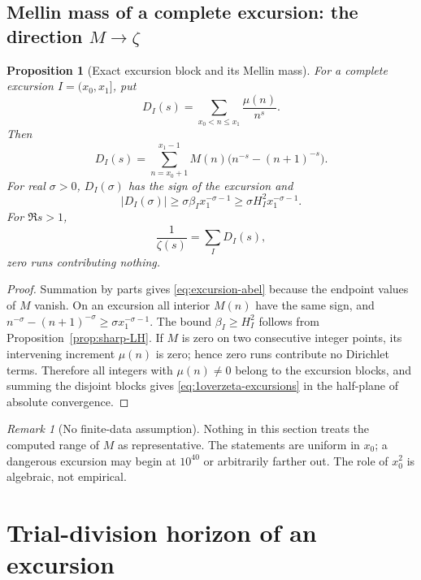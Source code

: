 \documentclass[11pt]{amsart}
\numberwithin{equation}{section}
\theoremstyle{plain}
\newtheorem{proposition}[theorem]{Proposition}
\theoremstyle{definition}
\theoremstyle{remark}
\newtheorem{remark}[theorem]{Remark}
\begin{document}
\subsection{Mellin mass of a complete excursion: the direction $M\to\zeta$}

\begin{proposition}[Exact excursion block and its Mellin mass]
\label{prop:excursion-mellin}
For a complete excursion $I=(x_0,x_1]$, put
\[
D_I(s)=\sum_{x_0<n\le x_1}\frac{\mu(n)}{n^s}.
\]
Then
\begin{equation}
\label{eq:excursion-abel}
D_I(s)=\sum_{n=x_0+1}^{x_1-1}M(n)
\bigl(n^{-s}-(n+1)^{-s}\bigr).
\end{equation}
For real $\sigma>0$, $D_I(\sigma)$ has the sign of the excursion and
\begin{equation}
\label{eq:excursion-mass-lower}
|D_I(\sigma)|\ge
\sigma\beta_I x_1^{-\sigma-1}
\ge\sigma H_I^2x_1^{-\sigma-1}.
\end{equation}
For $\Re s>1$,
\begin{equation}
\label{eq:1overzeta-excursions}
\frac1{\zeta(s)}=\sum_I D_I(s),
\end{equation}
zero runs contributing nothing.
\end{proposition}

\begin{proof}
Summation by parts gives \eqref{eq:excursion-abel} because the endpoint
values of $M$ vanish. On an excursion all interior $M(n)$ have the same
sign, and
$n^{-\sigma}-(n+1)^{-\sigma}\ge\sigma x_1^{-\sigma-1}$. The bound
$\beta_I\ge H_I^2$ follows from Proposition~\ref{prop:sharp-LH}. If $M$ is zero on two consecutive integer points, its intervening increment
$\mu(n)$ is zero; hence zero runs contribute no Dirichlet terms.  Therefore
all integers with $\mu(n)\ne0$ belong to the excursion blocks, and summing
the disjoint blocks gives \eqref{eq:1overzeta-excursions} in the half-plane
of absolute convergence.
\end{proof}

\begin{remark}[No finite-data assumption]
\label{rem:no-finite-data}
Nothing in this section treats the computed range of $M$ as representative.
The statements are uniform in $x_0$; a dangerous excursion may begin at
$10^{40}$ or arbitrarily farther out. The role of $x_0^2$ is algebraic, not
empirical.
\end{remark}

\section{Trial-division horizon of an excursion}
\label{sec:prime_horizon}
\end{document}
